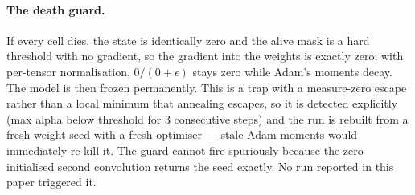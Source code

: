 \paragraph{The death guard.} If every cell dies, the state is identically zero
and the alive mask is a hard threshold with no gradient, so the gradient into the
weights is exactly zero; with per-tensor normalisation, $0/(0+\epsilon)$ stays
zero while Adam's moments decay. The model is then frozen permanently. This is a
trap with a measure-zero escape rather than a local minimum that annealing
escapes, so it is detected explicitly (max alpha below threshold for 3
consecutive steps) and the run is rebuilt from a fresh weight seed with a fresh
optimiser --- stale Adam moments would immediately re-kill it. The guard cannot
fire spuriously because the zero-initialised second convolution returns the seed
exactly. No run reported in this paper triggered it.
